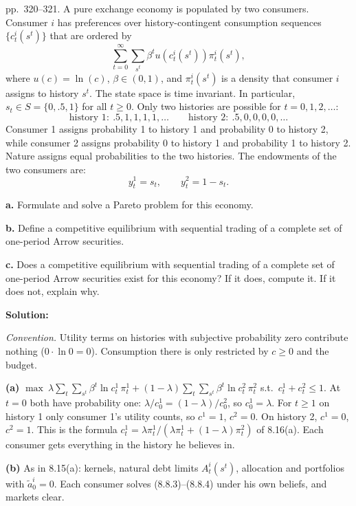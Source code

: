 \documentclass[12pt, letterpaper]{article}
\begin{document}
\begin{tcolorbox}[evenbox,title={Exercise 8.18 \quad Diverse beliefs, IV}]
\begin{tcolorbox}[questionbox]
pp.~320--321. A pure exchange economy is populated by two consumers. Consumer $i$ has preferences over
history-contingent consumption sequences $\{c^i_t(s^t)\}$ that are ordered by
\[
\sum_{t=0}^\infty\sum_{s^t}\beta^tu(c^i_t(s^t))\pi^i_t(s^t),
\]
where $u(c)=\ln(c)$, $\beta\in(0,1)$, and $\pi^i_t(s^t)$ is a density that consumer $i$ assigns to history $s^t$.
The state space is time invariant. In particular, $s_t\in S=\{0,.5,1\}$ for all $t\ge0$. Only two histories are
possible for $t=0,1,2,\dots$:
\[
\text{history 1}:\ .5,1,1,1,1,\dots\qquad\text{history 2}:\ .5,0,0,0,0,\dots
\]
Consumer 1 assigns probability 1 to history 1 and probability 0 to history 2, while consumer 2 assigns
probability 0 to history 1 and probability 1 to history 2. Nature assigns equal probabilities to the two
histories. The endowments of the two consumers are:
\[
y^1_t=s_t,\qquad y^2_t=1-s_t.
\]

\textbf{a.} Formulate and solve a Pareto problem for this economy.

\textbf{b.} Define a competitive equilibrium with sequential trading of a complete set of one-period Arrow
securities.

\textbf{c.} Does a competitive equilibrium with sequential trading of a complete set of one-period Arrow
securities exist for this economy? If it does, compute it. If it does not, explain why.
\end{tcolorbox}

\textbf{Solution:}

\emph{Convention.} Utility terms on histories with subjective probability zero contribute nothing
($0\cdot\ln0=0$). Consumption there is only restricted by $c\ge0$ and the budget.

\textbf{(a)} $\max\ \lambda\sum_t\sum_{s^t}\beta^t\ln c^1_t\,\pi^1_t+(1-\lambda)\sum_t\sum_{s^t}\beta^t\ln c^2_t\,\pi^2_t$
s.t.\ $c^1_t+c^2_t\le1$. At $t=0$ both have probability one: $\lambda/c^1_0=(1-\lambda)/c^2_0$, so $c^1_0=\lambda$. For
$t\ge1$ on history 1 only consumer 1's utility counts, so $c^1=1$, $c^2=0$. On history 2, $c^1=0$, $c^2=1$. This is
the formula $c^1_t=\lambda\pi^1_t/(\lambda\pi^1_t+(1-\lambda)\pi^2_t)$ of 8.16(a). Each consumer gets everything in the
history he believes in.

\textbf{(b)} As in 8.15(a): kernels, natural debt limits $A^i_t(s^t)$, allocation and portfolios with $\tilde a^i_0=0$.
Each consumer solves (8.8.3)--(8.8.4) under his own beliefs, and markets clear.


\end{tcolorbox}
\end{document}
